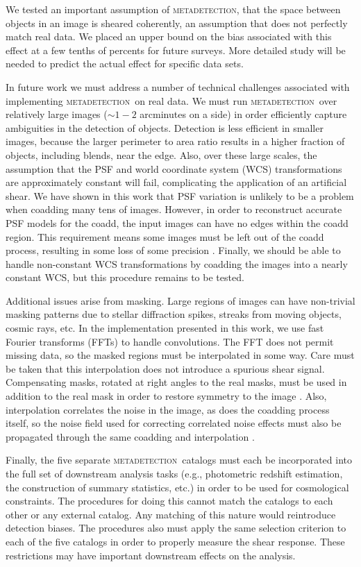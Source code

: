 \documentclass[iop, twocolappendix, appendixfloats, numberedappendix, apj]{hackemulateapj}
\newcommand{\mdet}{\textsc{metadetection}}
\begin{document}
We tested an important assumption of \mdet, that the space between objects in
an image is sheared coherently, an assumption that does not perfectly match
real data.  We placed an upper bound on the bias associated with this effect at
a few tenths of percents for future surveys. More detailed study will be needed
to predict the actual effect for specific data sets.

In future work we must address a number of technical challenges associated with
implementing \mdet\ on real data.  We must run \mdet\ over relatively large
images ($\sim1-2$ arcminutes on a side) in order efficiently capture
ambiguities in the detection of objects.  Detection is less efficient in
smaller images, because the larger perimeter to area ratio results in a higher
fraction of objects, including blends, near the edge.  Also, over these large
scales, the assumption that the PSF and world coordinate system (WCS)
transformations are approximately constant will fail, complicating the
application of an artificial shear. We have shown in this work that PSF
variation is unlikely to be a problem when coadding many tens of images.
However, in order to reconstruct accurate PSF models for the coadd, the input
images can have no edges within the coadd region. This requirement means some
images must be left out of the coadd process, resulting in some loss of some
precision \citep{ArmstrongCoadd}. Finally, we should be able to handle
non-constant WCS transformations by coadding the images into a nearly constant
WCS, but this procedure remains to be tested.

Additional issues arise from masking. Large regions of images can have
non-trivial masking patterns due to stellar diffraction spikes, streaks from
moving objects, cosmic rays, etc. In the implementation presented in this work,
we use fast Fourier transforms (FFTs) to handle convolutions. The FFT does not
permit missing data, so the masked regions must be interpolated in some way.
Care must be taken that this interpolation does not introduce a spurious shear
signal.  Compensating masks, rotated at right angles to the real masks, must be
used in addition to the real mask in order to restore symmetry to the image
\citep{SheldonMcal2017}.  Also, interpolation correlates the noise in the
image, as does the coadding process itself, so the noise field used for
correcting correlated noise effects must also be propagated through the same
coadding and interpolation \citep{SheldonMcal2017,ArmstrongCoadd}.

Finally, the five separate \mdet\ catalogs must each be incorporated into the
full set of downstream analysis tasks (e.g., photometric redshift estimation,
the construction of summary statistics, etc.) in order to be used for
cosmological constraints. The procedures for doing this cannot match the
catalogs to each other or any external catalog. Any matching of this nature would
reintroduce detection biases. The procedures also must apply the same
selection criterion to each of the five catalogs in order to properly measure
the shear response. These restrictions may have important downstream effects on
the analysis.
\end{document}
